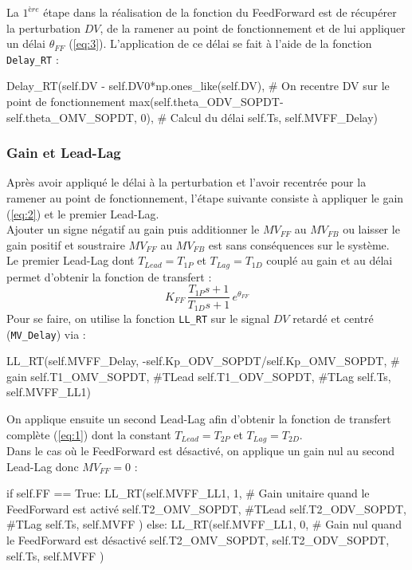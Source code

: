 La $1^{ère}$ étape dans la réalisation de la fonction du FeedForward est de récupérer la perturbation $DV$, de la ramener au point de fonctionnement et de lui appliquer un délai $\theta_{FF}$ (\ref{eq:3}).
L'application de ce délai se fait à l'aide de la fonction \texttt{Delay\_RT} :
\begin{python*}
	Delay_RT(self.DV - self.DV0*np.ones_like(self.DV), # On recentre DV sur le point de fonctionnement
		max(self.theta_ODV_SOPDT-self.theta_OMV_SOPDT, 0), # Calcul du délai 
		self.Ts, 
		self.MVFF_Delay)
\end{python*}

\subsubsection{Gain et Lead-Lag}
Après avoir appliqué le délai à la perturbation et l'avoir recentrée pour la ramener au point de fonctionnement, l'étape suivante
consiste à appliquer le gain (\ref{eq:2}) et le premier Lead-Lag.
\\Ajouter un signe négatif au gain puis additionner le $MV_{FF}$ au $MV_{FB}$ ou laisser le gain positif et soustraire $MV_{FF}$ au $MV_{FB}$ est sans conséquences sur le système.
\\Le premier Lead-Lag dont $T_{Lead} = T_{1P}$ et $T_{Lag} = T_{1D}$ couplé au gain et au délai permet d'obtenir la fonction de transfert : 
\[K_{FF}\, \frac{T_{1P}s + 1}{T_{1D}s + 1} \, e^{\theta_{FF}}\]
Pour se faire, on utilise la fonction \texttt{LL\_RT} sur le signal $DV$ retardé et centré (\texttt{MV\_Delay}) via : 
\begin{python*}
	LL_RT(self.MVFF_Delay, 
		-self.Kp_ODV_SOPDT/self.Kp_OMV_SOPDT, # gain
		self.T1_OMV_SOPDT, #TLead
		self.T1_ODV_SOPDT, #TLag
		self.Ts, 
		self.MVFF_LL1)
\end{python*}
On applique ensuite un second Lead-Lag afin d'obtenir la fonction de transfert complète (\ref{eq:1}) dont la
constant $T_{Lead} = T_{2P}$ et $T_{Lag} = T_{2D}$.
\\Dans le cas où le FeedForward est désactivé, on applique un gain nul au second Lead-Lag donc $MV_{FF} = 0$ : 
\begin{python*}
	if self.FF == True:
		LL_RT(self.MVFF_LL1, 
			1, # Gain unitaire quand le FeedForward est activé
			self.T2_OMV_SOPDT, #TLead
			self.T2_ODV_SOPDT, #TLag
			self.Ts, 
			self.MVFF
		)
	else:
		LL_RT(self.MVFF_LL1, 
			0, # Gain nul quand le FeedForward est désactivé
			self.T2_OMV_SOPDT, 
			self.T2_ODV_SOPDT, 
			self.Ts, 
			self.MVFF
			) 
\end{python*}





